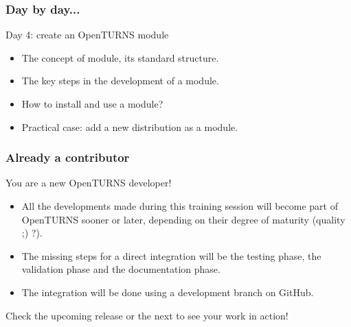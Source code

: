 \documentclass{beamer}
\begin{document}
\begin{frame}
  \frametitle{Day by day...}
  \begin{block}{Day 4: create an OpenTURNS module}
    \begin{itemize}
    \item The concept of module, its standard structure.
    \item The key steps in the development of a module.
    \item How to install and use a module?
    \item Practical case: add a new distribution as a module.
    \end{itemize}
  \end{block}
\end{frame}
\begin{frame}
  \frametitle{Already a contributor}
  \begin{block}{You are a new OpenTURNS developer!}
    \begin{itemize}
    \item All the developments made during this training session will become part of OpenTURNS sooner or later, depending on their degree of maturity (quality ;) ?).
    \item The missing steps for a direct integration will be the testing phase, the validation phase and the documentation phase.
    \item The integration will be done using a development branch on GitHub.
    \end{itemize}
    Check the upcoming release or the next to see your work in action!
  \end{block}
\end{frame}
\end{document}
